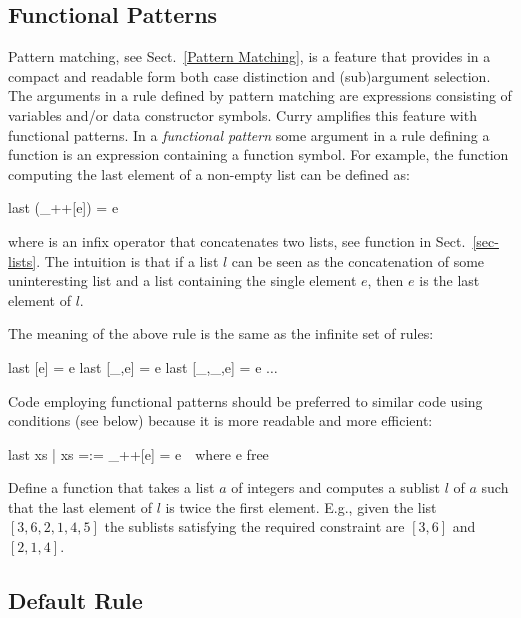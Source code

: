 \subsection{Functional Patterns}
\label{Functional Patterns}

Pattern matching, see Sect.~\ref{Pattern Matching}, is a feature that
provides in a compact and readable form both case distinction
and (sub)argument selection.
The arguments in a rule defined by pattern matching are expressions
consisting of variables and/or data constructor symbols.
Curry amplifies this feature with functional patterns.
In a \emph{functional pattern}
some argument in a rule defining
a function is an expression containing a function symbol.
For example, the function computing the last element
of a non-empty list can be defined as:
%
\begin{prog}
last (_++[e]) = e
\end{prog}
%
where \ccode{++} is an infix operator that concatenates two lists,
see function  in Sect.~\ref{sec-lists}.
The intuition is that if a list $l$ can be seen as the concatenation
of some uninteresting list and a list containing the single element $e$,
then $e$ is the last element of $l$.

The meaning of the above rule is the same as the infinite set of rules:
%
\begin{prog}
last [e] = e
last [_,e] = e
last [_,_,e] = e
$\ldots$%
\end{prog}

\noindent
Code employing functional patterns should be preferred to
similar code using conditions (see below)
because it is more readable and more efficient:
%
\begin{prog}
last xs | xs =:= _++[e] = e~~where e free  %
\end{prog}
%
\begin{exercise}
Define a function that takes a list $a$ of integers and
computes a sublist $l$ of $a$ such that the last element of $l$
is twice the first element.  E.g.,
given the list $[3,6,2,1,4,5]$ the sublists satisfying the
required constraint are $[3,6]$ and $[2,1,4]$.
\end{exercise}

\subsection{Default Rule}
\label{Default Rule}

